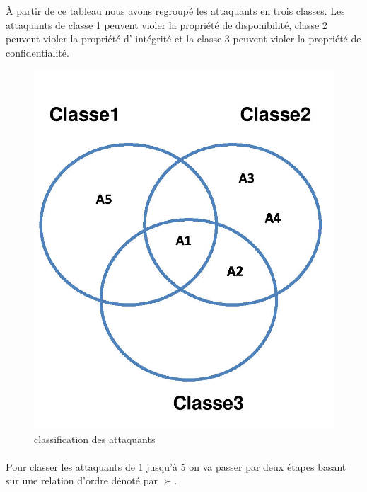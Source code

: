 \documentclass[10pt,a4paper]{article}
\begin{document}
À partir de ce tableau nous avons regroupé les attaquants en trois classes. Les attaquants de classe 1 peuvent violer la propriété de disponibilité, classe 2 peuvent violer la propriété d' intégrité et la classe 3 peuvent violer la propriété de confidentialité.  
\begin{figure}[!h]
\centering 
\includegraphics[scale=0.2]{img/classes.jpg}
\caption{classification des attaquants}
\end{figure}
\paragraph{}
Pour classer les attaquants de 1 jusqu'à 5 on va passer par deux étapes basant sur une relation d'ordre dénoté par $\succ$.\newline
\end{document}
